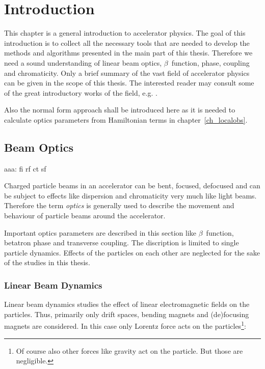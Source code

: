 \chapter{Introduction}

\lohead{\leftmark}
\rehead{\rightmark}
\setcounter{page}{1}

\begin{chapterinfo}
    This chapter is a general introduction to accelerator physics.
    The goal of this introduction is to collect all the necessary tools that are needed to develop
    the methods and algorithms presented in the main part of this thesis.
    Therefore we need a sound understanding of linear beam optics, 
    $\beta$~function, phase, coupling and chromaticity.
    Only a brief summary of the vast field of accelerator physics can be given in the scope of this
    thesis. The interested reader may consult some of the great introductory works of the field, e.g.
    \cite{WolskiBook}.

    Also the normal form approach shall be introduced here as it is needed to calculate optics
    parameters from Hamiltonian terms in chapter~\ref{ch_localobs}.

\end{chapterinfo}

\section{Beam Optics}

aaa: fi rf ct sf

Charged particle beams in an accelerator can be bent, focused, defocused and can be subject to effects
like dispersion and chromaticity very much like light beams. Therefore the term \emph{optics} is
generally used to describe the movement and behaviour of particle beams around the accelerator.

Important optics parameters are described in this section like $\beta$~function, betatron phase and
transverse coupling.
The discription is limited to single particle dynamics. Effects of the particles on each other are
neglected for the sake of the studies in this thesis.

\subsection{Linear Beam Dynamics}

Linear beam dynamics studies the effect of linear electromagnetic fields on the particles.
Thus, primarily only drift spaces, bending magnets and (de)focusing magnets are considered.
In this case only Lorentz force acts on the particles\footnote{Of course also other forces like gravity
act on the particle. But those are negligible.}:

